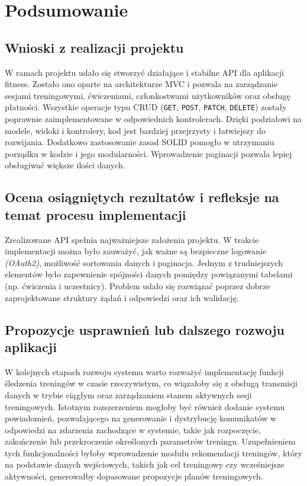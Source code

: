 \documentclass[../../spr.tex]{subfiles}
\begin{document}
\newpage
\section{Podsumowanie}

\subsection{Wnioski z realizacji projektu}
W ramach projektu udało się stworzyć działające i stabilne API dla aplikacji fitness.
Zostało ono oparte na architekturze MVC i pozwala na zarządzanie sesjami treningowymi,
ćwiczeniami, członkostwami użytkowników oraz obsługę płatności.
Wszystkie operacje typu CRUD (\texttt{GET}, \texttt{POST}, \texttt{PATCH},
\texttt{DELETE}) zostały poprawnie zaimplementowane w odpowiednich kontrolerach.
Dzięki podziałowi na modele, widoki i kontrolery, kod jest bardziej przejrzysty i
łatwiejszy do rozwijania.
Dodatkowo zastosowanie zasad SOLID pomogło w utrzymaniu porządku w kodzie i
jego modularności. Wprowadzenie paginacji pozwala lepiej obsługiwać większe
ilości danych.

\subsection{Ocena osiągniętych rezultatów i refleksje na temat procesu implementacji}
Zrealizowane API spełnia najważniejsze założenia projektu.
W trakcie implementacji można było zauważyć, jak ważne są bezpieczne logowanie \textit{(OAuth2)},
możliwość sortowania danych i paginacja.
Jednym z trudniejszych elementów było zapewnienie spójności danych pomiędzy
powiązanymi tabelami (np. ćwiczenia i uczestnicy).
Problem udało się rozwiązać poprzez dobrze zaprojektowane struktury żądań i
odpowiedzi oraz ich walidację.

\subsection{Propozycje usprawnień lub dalszego rozwoju aplikacji}
W kolejnych etapach rozwoju systemu warto rozważyć implementację funkcji śledzenia treningów
w czasie rzeczywistym, co wiązałoby się z obsługą transmisji danych w trybie ciągłym
oraz zarządzaniem stanem aktywnych sesji treningowych.
Istotnym rozszerzeniem mogłoby być również dodanie systemu powiadomień,
pozwalającego na generowanie i dystrybucję komunikatów w odpowiedzi na zdarzenia
zachodzące w systemie, takie jak rozpoczęcie, zakończenie lub przekroczenie określonych
parametrów treningu. Uzupełnieniem tych funkcjonalności byłoby wprowadzenie modułu
rekomendacji treningów, który na podstawie danych wejściowych, takich jak cel treningowy
czy wcześniejsze aktywności, generowałby dopasowane propozycje planów treningowych.
\end{document}
